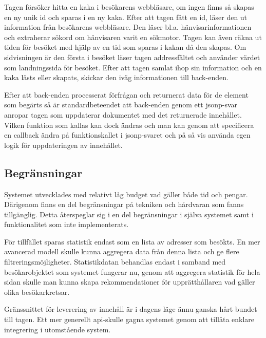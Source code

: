 Tagen försöker hitta en kaka i besökarens webbläsare, om ingen finns så skapas en ny unik id och sparas i en ny kaka. Efter att tagen fått en id, läser den ut information från besökarens webbläsare. Den läser bl.a. hänvisarinformationen och extraherar sökord om hänvisaren varit en sökmotor. Tagen kan även räkna ut tiden för besöket med hjälp av en tid som sparas i kakan då den skapas. Om sidvisningen är den första i besöket läser tagen addressfältet och använder värdet som landningssida för besöket. Efter att tagen samlat ihop sin information och en kaka lästs eller skapats, skickar den iväg informationen till back-enden.

Efter att back-enden processerat förfrågan och returnerat data för de element som begärts så är standardbeteendet att back-enden genom ett \gls{jsonp}-svar anropar tagen som uppdaterar dokumentet med det returnerade innehållet. Vilken funktion som kallas kan dock ändras och man kan genom att specificera en callback ändra på funktionskallet i \gls{jsonp}-svaret och på så vis använda egen logik för uppdateringen av innehållet.

\subsection{Begränsningar}

Systemet utvecklades med relativt låg budget vad gäller både tid och pengar. Därigenom finns en del begränsningar på tekniken och hårdvaran som fanns tillgänglig. Detta återspeglar sig i en del begränsningar i själva systemet samt i funktionalitet som inte implementerats.

För tillfället sparas statistik endast som en lista av adresser som besökts. En mer avancerad modell skulle kunna aggregera data från denna lista och ge flere filtreringsmöjligheter. Statistikdatan behandlas endast i samband med besökarobjektet som systemet fungerar nu, genom att aggregera statistik för hela sidan skulle man kunna skapa rekommendationer för upprätthållaren vad gäller olika besökarkretsar.

Gränssnittet för leverering av innehåll är i dagens läge ännu ganska hårt bundet till tagen. Ett mer generellt \gls{api}-skulle gagna systemet genom att tillåta enklare integrering i utomstående system.

